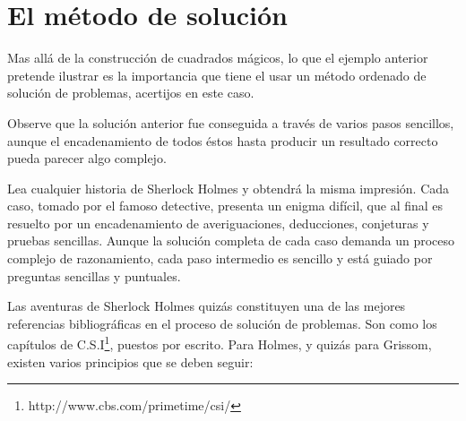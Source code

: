 \section{El método de solución}
\label{sec:metodosolucion}

Mas allá de la construcción de cuadrados mágicos, lo que el ejemplo
anterior pretende ilustrar es la importancia que tiene el usar un 
método ordenado de solución de problemas, acertijos en este caso.

Observe que la solución anterior fue conseguida a través de varios
pasos sencillos, aunque el encadenamiento de todos éstos hasta 
producir un resultado correcto pueda parecer algo complejo.

Lea cualquier historia de Sherlock Holmes y obtendrá la misma
impresión. Cada caso, tomado por el famoso detective, presenta un
enigma difícil, que al final es resuelto por un encadenamiento
de averiguaciones, deducciones, conjeturas y pruebas sencillas. Aunque
la solución completa de cada caso demanda un proceso complejo de
razonamiento, cada paso intermedio es sencillo y está guiado por
preguntas sencillas y puntuales.

Las aventuras de Sherlock Holmes quizás constituyen una de las 
mejores referencias bibliográficas en el proceso de solución de problemas. 
Son como los capítulos de C.S.I\footnote{http://www.cbs.com/primetime/csi/}, 
puestos por escrito. Para Holmes, y quizás para Grissom, existen varios 
principios que se deben seguir:

